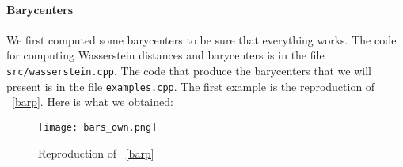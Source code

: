 \paragraph{Barycenters}
We first computed some barycenters to be sure that everything works. The code for computing Wasserstein distances and barycenters is in the file \verb|src/wasserstein.cpp|. The code that produce the barycenters that we will present is in the file \verb|examples.cpp|. The first example is the reproduction of \figurename~\ref{barp}. Here is what we obtained:

\begin{figure}[h]
	\centering
	\texttt{[image: bars\_own.png]}
	\caption{Reproduction of \figurename~\ref{barp}}
\end{figure}